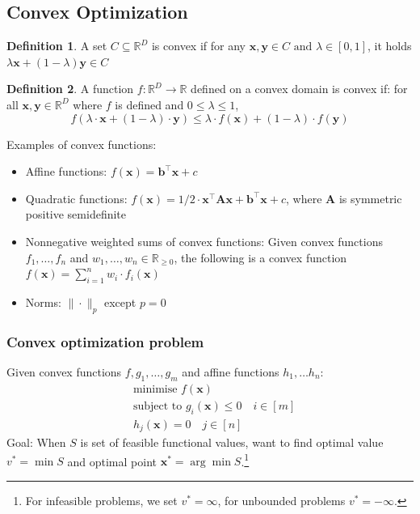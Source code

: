 \documentclass[11pt, %
	oneside, %
	english, %
	onehalfspacing, %
	parskip, %
	]{article} %
\theoremstyle{definition}
\newtheorem{definition}{Definition}
\begin{document}
\subsection{Convex Optimization}

\begin{definition}
	A set $C \subseteq \mathbb{R}^D$ is convex if for any $\mathbf{x}, \mathbf{y} \in C \text { and } \lambda \in[0,1]$, it holds $\lambda \mathbf{x}+(1-\lambda) \mathbf{y} \in C$
\end{definition}

\begin{definition}
	A function $f: \mathbb{R}^D \rightarrow \mathbb{R}$ defined on a convex domain is convex if: for all $\mathbf{x}, \mathbf{y} \in \mathbb{R}^D$ where $f$ is defined and $0 \leq \lambda \leq 1$,
	$$
	f(\lambda \cdot \mathbf{x}+(1-\lambda) \cdot \mathbf{y}) \leq \lambda \cdot f(\mathbf{x})+(1-\lambda) \cdot f(\mathbf{y})
	$$
\end{definition}

Examples of convex functions:
\begin{itemize}
	\item Affine functions: $f(\mathbf{x})=\mathbf{b}^{\top} \mathbf{x}+c$
	\item Quadratic functions: $f(\mathbf{x})=1 / 2 \cdot \mathbf{x}^{\top} \mathbf{A} \mathbf{x}+\mathbf{b}^{\top} \mathbf{x}+c$, where $\mathbf{A}$ is symmetric positive semidefinite
	\item Nonnegative weighted sums of convex functions: Given convex functions $f_1, \ldots, f_n$ and $w_1, \ldots, w_n \in \mathbb{R}_{\geq 0}$, the following is a convex function $f(\mathbf{x})=\sum_{i=1}^n w_i \cdot f_i(\mathbf{x})$
	\item Norms: $\|\cdot\|_p$ except $p=0$
\end{itemize}

\subsubsection*{Convex optimization problem}

Given convex functions $f, g_1, \ldots, g_m$ and affine functions $h_1, \ldots h_{n}$:
$$
\begin{aligned}
& \text {minimise } f(\mathbf{x}) \\
& \text {subject to } g_i(\mathbf{x}) \leq 0 \quad i \in[m] \\
& h_j(\mathbf{x})=0 \quad j \in[n]
\end{aligned}
$$
Goal: When $S$ is set of feasible functional values, want to find optimal value $v^* = \min S$ and optimal point $\mathbf{x}^* = \arg \min S$.\footnote{For infeasible problems, we set $v^* = \infty$, for unbounded problems $v^* = -\infty$.}
\end{document}
